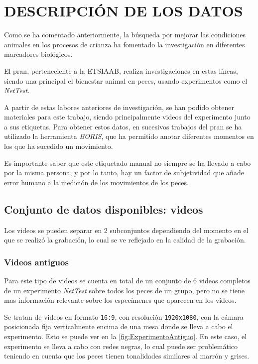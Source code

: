 \section{DESCRIPCIÓN DE LOS DATOS}

Como se ha comentado anteriormente, la búsqueda por mejorar las condiciones animales en los procesos de crianza ha fomentado la investigación en 
diferentes marcadores biológicos.

El \acrfull{pran}\cite{ObservatorioUPM}, perteneciente a la \acrfull{ETSIAAB}, realiza investigaciones en estas líneas, siendo una principal el bienestar animal en peces, 
usando experimentos como el \textit{NetTest}.

A partir de estas labores anteriores de investigación, se han podido obtener materiales para este trabajo, siendo principalmente videos del experimento junto a sus etiquetas. Para obtener 
estos datos, en sucesivos trabajos del \acrshort{pran} se ha utilizado la herramienta \textit{BORIS}\cite{friardBORISFreeVersatile2016}, que ha permitido anotar diferentes momentos en los que 
ha sucedido un movimiento.

Es importante saber que este etiquetado manual no siempre se ha llevado a cabo por la misma persona, y por lo tanto, hay un factor de subjetividad que añade error humano a la medición de los 
movimientos de los peces.

\subsection{Conjunto de datos disponibles: videos}

Los videos se pueden separar en 2 subconjuntos dependiendo del momento en el que se realizó la grabación, lo cual se ve reflejado en la calidad de la grabación.

\subsubsection{Videos antiguos}

Para este tipo de videos se cuenta en total de un conjunto de 6 videos completos de un experimento \textit{NetTest} sobre todos los peces de un grupo, pero no se tiene mas información relevante sobre 
los especímenes que aparecen en los videos.

Se tratan de videos en formato \texttt{16:9}, con resolución \texttt{1920x1080}, con la cámara posicionada fija verticalmente encima de una mesa donde se lleva a cabo el experimento. Esto se puede ver 
en la \autoref{fig:ExperimentoAntiguo}. En este caso, el experimento se lleva a cabo con redes negras, lo cual puede ser problemático teniendo en cuenta que los peces tienen 
tonalidades similares al marrón y grises.

